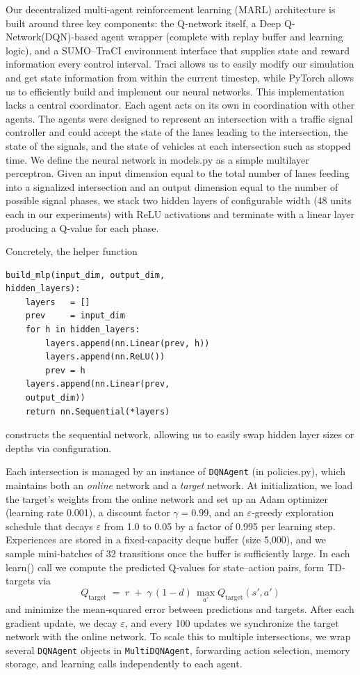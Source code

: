\documentclass[conference]{IEEEtran}
\begin{document}
Our decentralized multi‐agent reinforcement learning (MARL) architecture is built around three key components: the Q‐network itself, a Deep Q-Network(DQN)‐based agent wrapper (complete with replay buffer and learning logic), and a SUMO–TraCI environment interface that supplies state and reward information every control interval. Traci allows us to easily modify our simulation and get state information from within the current timestep, while PyTorch allows us to efficiently build and implement our neural networks. This implementation lacks a central coordinator. Each agent acts on its own in coordination with other agents. The agents were designed to represent an intersection with a traffic signal controller and could accept the state of the lanes leading to the intersection, the state of the signals, and the state of vehicles at each intersection such as stopped time. We define the neural network in models.py as a simple multilayer perceptron. Given an input dimension equal to the total number of lanes feeding into a signalized intersection and an output dimension equal to the number of possible signal phases, we stack two hidden layers of configurable width (48 units each in our experiments) with ReLU activations and terminate with a linear layer producing a Q‐value for each phase. 
 
Concretely, the helper function
\begin{verbatim}
build_mlp(input_dim, output_dim, 
hidden_layers):
    layers   = []
    prev     = input_dim
    for h in hidden_layers:
        layers.append(nn.Linear(prev, h))
        layers.append(nn.ReLU())
        prev = h
    layers.append(nn.Linear(prev, 
    output_dim))
    return nn.Sequential(*layers)
\end{verbatim}
constructs the sequential network, allowing us to easily swap hidden layer sizes or depths via configuration.

Each intersection is managed by an instance of {\tt DQNAgent} (in policies.py), which maintains both an \emph{online} network and a \emph{target} network. At initialization, we load the target’s weights from the online network and set up an Adam optimizer (learning rate 0.001), a discount factor $\gamma=0.99$, and an $\varepsilon$‐greedy exploration schedule that decays $\varepsilon$ from 1.0 to 0.05 by a factor of 0.995 per learning step. Experiences are stored in a fixed‐capacity deque buffer (size 5,000), and we sample mini‐batches of 32 transitions once the buffer is sufficiently large. In each learn() call we compute the predicted Q‐values for state–action pairs, form TD‐targets via 
\[
Q_{\mathrm{target}} \;=\; r \;+\; \gamma\,(1 - d)\,\max_{a'} Q_{\mathrm{target}}(s', a')
\]
and minimize the mean‐squared error between predictions and targets. After each gradient update, we decay $\varepsilon$, and every 100 updates we synchronize the target network with the online network. To scale this to multiple intersections, we wrap several {\tt DQNAgent} objects in {\tt MultiDQNAgent}, forwarding action selection, memory storage, and learning calls independently to each agent.
\end{document}
